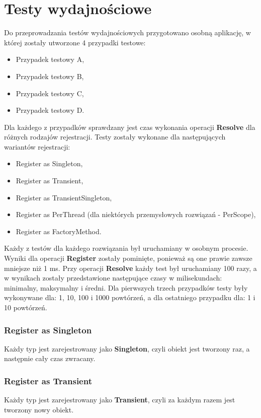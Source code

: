 \documentclass[12pt]{article}
\begin{document}
\section{Testy wydajnościowe}
Do przeprowadzania testów wydajnościowych przygotowano osobną aplikację, w której zostały utworzone 4 przypadki testowe:
\begin{itemize}
	\item Przypadek testowy A,
	\item Przypadek testowy B,
	\item Przypadek testowy C,
	\item Przypadek testowy D.
\end{itemize}
Dla każdego z przypadków sprawdzany jest czas wykonania operacji \textbf{Resolve} dla różnych rodzajów rejestracji. Testy zostały wykonane dla następujących wariantów rejestracji:
\begin{itemize}
	\item Register as Singleton,
	\item Register as Transient,
	\item Register as TransientSingleton,
	\item Register as PerThread (dla niektórych przemysłowych rozwiązań - PerScope),
	\item Register as FactoryMethod.
\end{itemize}
Każdy z testów dla każdego rozwiązania był uruchamiany w osobnym procesie. Wyniki dla operacji \textbf{Register} zostały pominięte, ponieważ są one prawie zawsze mniejsze niż 1 ms. Przy operacji \textbf{Resolve} każdy test był uruchamiany 100 razy, a w wynikach zostały przedstawione następujące czasy w milisekundach: minimalny, maksymalny i średni. Dla pierwszych trzech przypadków testy były wykonywane dla: 1, 10, 100 i 1000 powtórzeń, a dla ostatniego przypadku dla: 1 i 10 powtórzeń.

\subsubsection{Register as Singleton}
Każdy typ jest zarejestrowany jako \textbf{Singleton}, czyli obiekt jest tworzony raz, a następnie cały czas zwracany.

\subsubsection{Register as Transient}
Każdy typ jest zarejestrowany jako \textbf{Transient}, czyli za każdym razem jest tworzony nowy obiekt.
\end{document}
